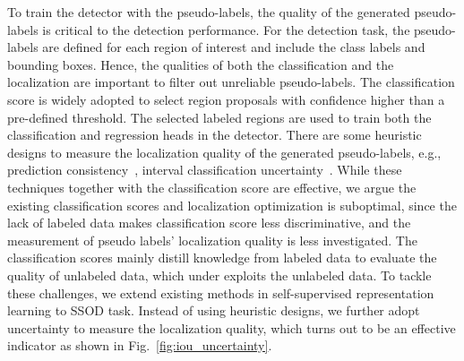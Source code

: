 \documentclass{bmvc2k}
\begin{document}
To train the detector with the pseudo-labels, the quality of the generated pseudo-labels is critical to the detection performance.
For the detection task, the pseudo-labels are defined for each region of interest and include the class labels and bounding boxes.
Hence, the qualities of both the classification and the localization are important to filter out unreliable pseudo-labels.
The classification score is widely adopted to select region proposals with confidence higher than a pre-defined threshold. The selected labeled regions are used to train both the classification and regression heads in the detector.
There are some heuristic designs to measure the localization quality of the generated pseudo-labels, e.g., prediction consistency~\cite{xu2021soft}, interval classification uncertainty~\cite{rethink}.
While these techniques together with the classification score are effective, we argue the existing classification scores and localization optimization is suboptimal, since the lack of labeled data makes classification score less discriminative, and the measurement of pseudo labels' localization quality is less investigated. 
The classification scores mainly distill knowledge from labeled data to evaluate the quality of unlabeled data, which under exploits the unlabeled data. 
To tackle these challenges, we extend existing methods in self-supervised representation learning to SSOD task. Instead of using heuristic designs, we further adopt uncertainty to measure the localization quality, which turns out to be an effective indicator as shown in Fig.~\ref{fig:iou_uncertainty}.
\end{document}
